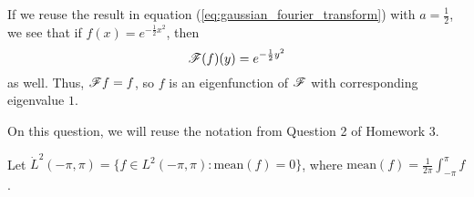 \documentclass{homework}
\begin{document}
\begin{arabicparts}
		\questionpart If we reuse the result in equation (\ref{eq:gaussian_fourier_transform}) with $a = \frac{1}{2}$, we see that if $f(x) = e^{-\frac{1}{2}x^2}$, then
		\begin{equation}
			\mathscr{F}(f)(y) = e^{-\frac{1}{2}y^2}
		\end{equation}
		as well. Thus, $\mathscr{F} f = f$, so $f$ is an eigenfunction of $\mathscr{F}$ with corresponding eigenvalue $1$.
	\end{arabicparts}
	
	\question
	On this question, we will reuse the notation from Question 2 of Homework 3.
	
	Let $\dot{L}^2(-\pi, \pi) = \{f \in L^2(-\pi, \pi) : \mathrm{mean}(f) = 0\}$, where $\mathrm{mean}(f) = \frac{1}{2\pi}\int_{-\pi}^\pi f$.
	\begin{arabicparts}
		\questionpart
	\end{arabicparts}
\end{document}
